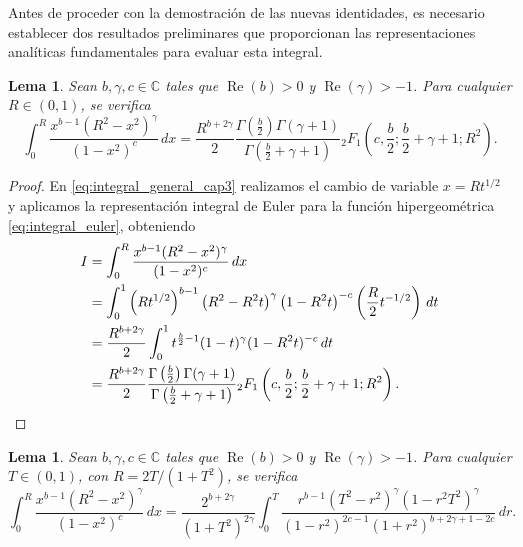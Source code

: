 \documentclass[12pt,a4paper]{book}
\newtheorem{lemma}[theorem]{Lema}
\begin{document}
Antes de proceder con la demostración de las nuevas identidades, es necesario establecer dos resultados preliminares que proporcionan las representaciones analíticas fundamentales para evaluar esta integral.

\begin{lemma}
\label{lema:i_izq}
Sean $b, \gamma, c \in \mathbb{C}$ tales que $\operatorname{Re}(b) > 0$ y $\operatorname{Re}(\gamma) > -1$. Para cualquier $R \in (0, 1)$, se verifica
\[
    \int_{0}^{R} \frac{x^{b-1} (R^2 - x^2)^\gamma}{(1 - x^2)^c} \, dx = \frac{R^{b+2\gamma}}{2} \frac{\Gamma\left(\frac{b}{2}\right) \Gamma(\gamma+1)}{\Gamma\left(\frac{b}{2}+\gamma+1\right)} {}_{2}F_{1}\left(c, \frac{b}{2}; \frac{b}{2}+\gamma+1; R^2\right).
\]
\end{lemma}

\begin{proof}
En \eqref{eq:integral_general_cap3} realizamos el cambio de variable $x = R t^{1/2}$ y aplicamos la representación integral de Euler para la función hipergeométrica \eqref{eq:integral_euler}, obteniendo
\begin{align*}
    I &=\int_{0}^{R} \frac{x^{b-1} (R^2 - x^2)^\gamma}{(1 - x^2)^c} \, dx \\
    &= \int_{0}^{1} \left(R t^{1/2}\right)^{b-1} \left(R^2 - R^2 t\right)^{\gamma} \left(1 - R^2 t\right)^{-c} \left(\frac{R}{2} t^{-1/2}\right) \, dt \\
    &= \frac{R^{b+2\gamma}}{2} \int_{0}^{1} t^{\frac{b}{2}-1} (1 - t)^{\gamma} (1 - R^2 t)^{-c} \, dt \\
    &= \frac{R^{b+2\gamma}}{2} \frac{\Gamma\left(\frac{b}{2}\right) \Gamma(\gamma+1)}{\Gamma\left(\frac{b}{2}+\gamma+1\right)} {}_{2}F_{1}\left(c, \frac{b}{2}; \frac{b}{2}+\gamma+1; R^2\right).
    \qedhere
\end{align*}
\end{proof}

\begin{lemma}
\label{lema:i_der}
Sean $b, \gamma, c \in \mathbb{C}$ tales que $\operatorname{Re}(b) > 0$ y $\operatorname{Re}(\gamma) > -1$. Para cualquier $T \in (0, 1)$, con $R = 2T/(1+T^2)$, se verifica
\[
    \int_{0}^{R} \frac{x^{b-1} (R^2 - x^2)^\gamma}{(1 - x^2)^c} \, dx = \frac{2^{b+2\gamma}}{(1+T^2)^{2\gamma}} \int_{0}^{T} \frac{r^{b-1} (T^2-r^2)^\gamma (1-r^2T^2)^\gamma}{(1-r^2)^{2c-1}(1+r^2)^{b+2\gamma+1-2c}} \, dr.
\]
\end{lemma}
\end{document}
